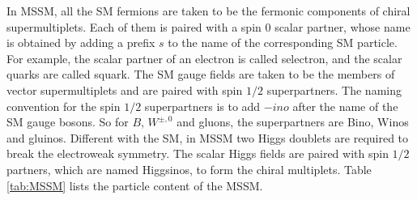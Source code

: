 \documentclass[thesis.tex]{subfiles}
\begin{document}
In MSSM, all the SM fermions are taken to be the fermonic components of chiral supermultiplets. 
Each of them is paired with a spin 0 scalar partner, whose name is obtained by adding a prefix $s$ to the name of the corresponding SM particle.
For example, the scalar partner of an electron is called selectron, and the scalar quarks are called squark. 
The SM gauge fields are taken to be the members of vector supermultiplets and are paired with spin $1/2$ superpartners. 
The naming convention for the spin $1/2$ superpartners is to add $-ino$ after the name of the SM gauge bosons. 
So for $B$, $W^{\pm, 0}$ and gluons, the superpartners are Bino, Winos and gluinos. 
Different with the SM, in MSSM two Higgs doublets are required to break the electroweak symmetry. 
The scalar Higgs fields are paired with spin $1/2$ partners, which are named Higgsinos, to form the chiral multiplets.
Table \ref{tab:MSSM} lists the particle content of the MSSM. 
\end{document}
